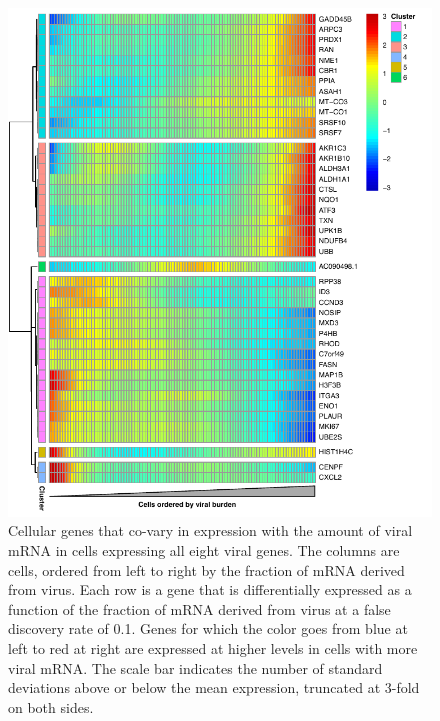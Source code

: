 \documentclass[9pt,lineno]{elife}
\providecommand{\DIFdelbegin}{} %
\providecommand{\DIFaddbeginFL}{} %
\providecommand{\DIFaddendFL}{} %
\providecommand{\DIFdelbeginFL}{} %
\providecommand{\DIFdelendFL}{} %
\begin{document}
\DIFdelbegin %
\DIFdelendFL \DIFaddbeginFL \begin{figure}[t!]
\centerline{\includegraphics[width=0.65\linewidth]{figures/p_cellular_heatmap_manualedits.pdf}}
\DIFaddendFL \caption{\label{fig:cellulargenes}
Cellular genes that co-vary in expression with the amount of viral mRNA in cells expressing all eight viral genes.
The columns are cells, ordered from left to right by the fraction of mRNA derived from virus.
Each row is a gene that is differentially expressed as a function of the fraction of mRNA derived from virus at a false discovery rate of 0.1. 
Genes for which the color goes from blue at left to red at right are expressed at higher levels in cells with more viral mRNA.
The scale bar indicates the number of standard deviations above or below the mean expression, truncated at 3-fold on both sides. 
}
\DIFdelbeginFL %
\DIFdelendFL \DIFaddbeginFL 




\end{figure}
\end{document}
